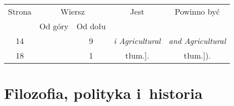 \documentclass[a4paper,11pt]{article}
\begin{document}
\newpage



\begin{center}

  \begin{tabular}{|c|c|c|c|c|}
    \hline
    Strona & \multicolumn{2}{c|}{Wiersz} & Jest
                              & Powinno być \\ \cline{2-3}
    & Od góry & Od dołu & & \\
    \hline
    14 & &  9 & \textit{i Agricultural} & \textit{and Agricultural} \\
    18 & &  1 & tłum.]. & tłum.]). \\
    \hline
  \end{tabular}

\end{center}

\vspace{\spaceTwo}













\newpage

\section{Filozofia, polityka i~historia}

\vspace{\spaceTwo}




\vspace{0em}



\vspace{0em}
\end{document}
